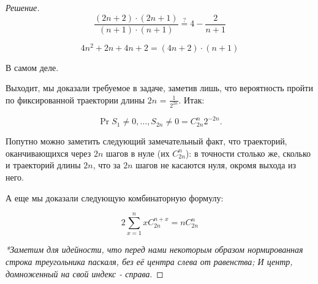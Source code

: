 \documentclass{article}
\begin{document}
\begin{proof}[Решение]
\[
        \frac{(2n+2) \cdot (2n+1)}{(n+1) \cdot (n+1)} \stackrel{?}{=} 4 - \frac{2}{n+1}
\]

\[
        4n^2 + 2n + 4n + 2 = (4n +2) \cdot (n+1)
\]

В самом деле.
\vspace{\baselineskip}

Выходит, мы доказали требуемое в задаче, заметив лишь, что вероятность пройти по фиксированной траектории длины $2n$ = $\frac{1}{2^{2n}}$. Итак:

\[
                \Pr{S_1 \neq 0,\dots, S_{2n} \neq 0} = C_{2n}^n 2^{-2n}.
\]

Попутно можно заметить следующий замечательный факт, что траекторий, оканчивающихся через $2n$ шагов в нуле (их $C_{2n}^{n}$): в точности столько же, сколько и траекторий длины $2n$, что за $2n$ шагов не касаются нуля, окромя выхода из него.

\vspace{\baselineskip}

А еще мы доказали следующую комбинаторную формулу:

\[
        2 \sum_{x = 1}^{n}   x C_{2n}^{n+x} = n C_{2n}^{n} 
\]
     
\textit{*Заметим для идейности, что перед нами некоторым образом нормированная строка треугольника паскаля, без её центра слева от равенства; И центр, домноженный на свой индекс - справа}.
        \end{proof}
       
       
        \vspace{\baselineskip}
        
\end{document}
